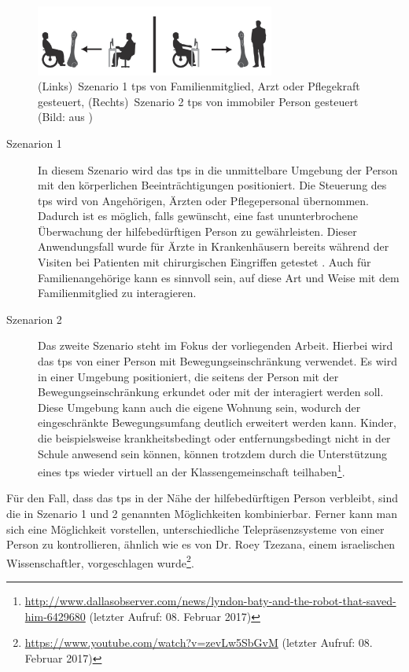 \begin{description}
\begin{figure}[ht]
   \begin{minipage}[b]{\linewidth} 
      \centering 
      \includegraphics[width=0.7\textwidth]{bilder/grundlagen/Szenario.png}
   \end{minipage}%
   \caption{(Links)~Szenario 1 \acs{tps} von Familienmitglied, Arzt oder Pflegekraft gesteuert, (Rechts)~Szenario 2 \acs{tps} von immobiler Person gesteuert (Bild: aus \cite[S.1]{tsui2011})}\label{fig:szenario} 
\end{figure} 

\begin{description}
\item[Szenarion 1] In diesem Szenario wird das \acs{tps} in die unmittelbare Umgebung der Person mit den körperlichen Beeinträchtigungen positioniert. Die Steuerung des \acs{tps} wird von Angehörigen, Ärzten oder Pflegepersonal übernommen. Dadurch ist es möglich, falls gewünscht, eine fast ununterbrochene Überwachung der hilfebedürftigen Person zu gewährleisten. Dieser Anwendungsfall wurde für Ärzte in Krankenhäusern bereits während der Visiten bei Patienten mit chirurgischen Eingriffen getestet \cite{Ellison2004}. Auch für Familienangehörige kann es sinnvoll sein, auf diese Art und Weise mit dem Familienmitglied zu interagieren.
\item[Szenarion 2] Das zweite Szenario steht im Fokus der vorliegenden Arbeit. Hierbei wird das \acs{tps} von einer Person mit Bewegungseinschränkung verwendet. Es wird in einer Umgebung positioniert, die seitens der Person mit der Bewegungseinschränkung erkundet oder mit der interagiert werden soll. Diese Umgebung kann auch die eigene Wohnung sein, wodurch der eingeschränkte Bewegungsumfang deutlich erweitert werden kann. Kinder, die beispielsweise krankheitsbedingt oder entfernungsbedingt nicht in der Schule anwesend sein können, können trotzdem durch die Unterstützung eines \acs{tps} wieder virtuell an der Klassengemeinschaft teilhaben\footnote{\url{http://www.dallasobserver.com/news/lyndon-baty-and-the-robot-that-saved-him-6429680} (letzter Aufruf: 08. Februar 2017)}. 
\end{description}
Für den Fall, dass das \acs{tps} in der Nähe der hilfebedürftigen Person verbleibt, sind die in Szenario 1 und 2 genannten Möglichkeiten kombinierbar. Ferner kann man sich eine Möglichkeit vorstellen, unterschiedliche Telepräsenzsysteme von einer Person zu kontrollieren, ähnlich wie es von Dr. Roey Tzezana, einem israelischen Wissenschaftler, vorgeschlagen wurde\footnote{\url{https://www.youtube.com/watch?v=zevLw5SbGvM} (letzter Aufruf: 08. Februar 2017)}.

\end{description}

